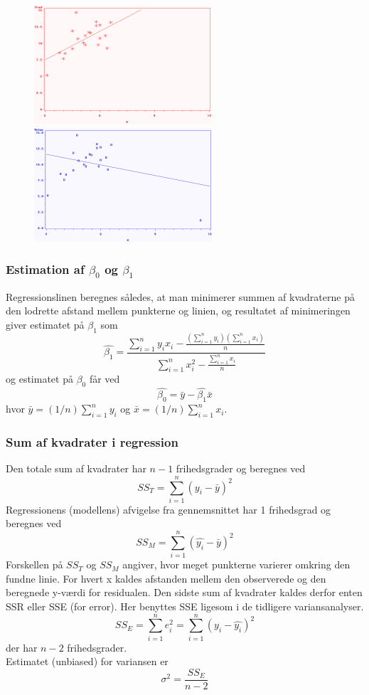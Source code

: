 \documentclass[11pt]{article}
\begin{document}
\begin{figure}[H]
\centering
\includegraphics[scale=0.8]{img/regres1}
\includegraphics[scale=0.83]{img/regres3}
\end{figure}

\subsubsection{Estimation af $\beta_0$ og $\beta_1$}
Regressionslinen beregnes således, at man minimerer summen af kvadraterne på den lodrette afstand mellem punkterne og linien, og resultatet af minimeringen giver estimatet på $\beta_1$ som
$$\hat{\beta_1}=\frac{\sum^n_{i=1}y_i x_i-\frac{\left(\sum^n_{i=1}y_i\right)\left(\sum^n_{i=1}x_i\right)}{n}}{\sum^n_{i=1}x^2_i-\frac{\sum^n_{i=1}x_i}{n}}$$
og estimatet på $\beta_0$ får ved
$$\hat{\beta_0}=\bar{y}-\hat{\beta_1}\bar{x}$$
hvor $\bar{y}=(1/n)\sum^n_{i=1}y_i$ og $\bar{x}=(1/n)\sum^n_{i=1}x_i$.

\subsubsection{Sum af kvadrater i regression}
Den totale sum af kvadrater har $n - 1$ frihedsgrader og beregnes ved
$$SS_T=\sum^n_{i=1}(y_i-\bar{y})^2$$
Regressionens (modellens) afvigelse fra gennemsnittet har 1 frihedsgrad og beregnes ved
$$SS_M=\sum^n_{i=1}(\hat{y_i}-\bar{y})^2$$
Forskellen på $SS_T$ og $SS_M$ angiver, hvor meget punkterne varierer omkring den fundne linie. For hvert x kaldes afstanden mellem den observerede og den beregnede y-værdi for residualen. Den sidste sum af kvadrater kaldes derfor enten SSR eller SSE (for error). Her benyttes SSE ligesom i de tidligere variansanalyser.
$$SS_E=\sum^n_{i=1}e^2_i=\sum^n_{i=1}(y_i-\hat{y_i})^2$$
der har $n - 2$ frihedsgrader.\\[0.2cm]
Estimatet (unbiased) for variansen er
$$\sigma^2=\frac{SS_E}{n-2}$$
\end{document}
